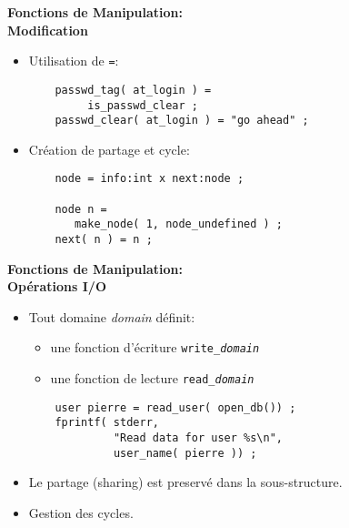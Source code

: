 \documentclass[11pt]{article}
\begin{document}
{\newpage

\begin{center}
{\huge\bf Fonctions de Manipulation: \\
Modification}
\end{center}

\vskip 2cm

\begin{itemize}
\item Utilisation de {\tt =}:

\begin{verbatim}
    passwd_tag( at_login ) = 
         is_passwd_clear ;
    passwd_clear( at_login ) = "go ahead" ;
\end{verbatim}
\item Création de partage et cycle:

\begin{verbatim}
    node = info:int x next:node ;

    node n = 
       make_node( 1, node_undefined ) ;
    next( n ) = n ; 
\end{verbatim}
\end{itemize}

\newpage

\begin{center}
{\huge\bf Fonctions de Manipulation: \\
Opérations I/O}
\end{center}

\vskip 2cm

\begin{itemize}
\item Tout domaine {\em domain} définit:
    \begin{itemize}
    \item une fonction d'écriture {\tt write\_{\em domain}}
    \item une fonction de lecture {\tt read\_{\em domain}}
    \end{itemize}

\begin{verbatim}
    user pierre = read_user( open_db()) ;
    fprintf( stderr, 
             "Read data for user %s\n", 
             user_name( pierre )) ;
\end{verbatim}
\item Le partage (sharing) est preservé dans la sous-structure.
\item Gestion des cycles.
\end{itemize}

\newpage

}
\end{document}
